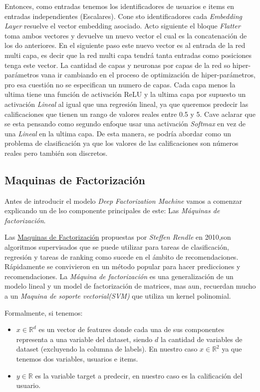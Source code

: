 \documentclass[11pt,a4paper,twoside]{thesis}
\begin{document}
Entonces, como entradas tenemos los identificadores de usuarios e items en entradas independientes (Escalares). Cone sto identificadores cada \textit{Embedding Layer} resuelve el vector embedding asociado. Acto siguiente el bloque \textit{Flatter} toma ambos vectores y devuelve un nuevo vector el cual es la concatenación de los do anteriores. En el siguiente paso este nuevo vector es al entrada de la red multi capa, es decir que la red multi capa tendrá tanta entradas como posiciones tenga este vector. La cantidad de capas y neuronas por capas de la red so hiper-parámetros vana  ir cambiando en el proceso de optimización de hiper-parámetros, pro esa cuestión no se especifican un numero de capas. Cada capa menos la ultima tiene una función de activación ReLU y la ultima capa por supuesto un activación \textit{Lineal} al igual que una regresión lineal, ya que queremos predecir las calificaciones que tienen un rango de valores reales entre 0.5 y 5. Cave aclarar que se esta pensando como segundo enfoque usar una activación \textit{Softmax} en vez de una \textit{Lineal} en la ultima capa. De esta manera, se podría abordar como un problema de clasificación ya que los valores de las calificaciones son números reales pero también son discretos.


\subsection{Maquinas de Factorización}


Antes de introducir el modelo \textit{Deep Factorization Machine} vamos a comenzar explicando un de lso componente principales de este: Las \textit{Máquinas de factorización}. 

Las \href{https://www.csie.ntu.edu.tw/~b97053/paper/Rendle2010FM.pdf}{Maquinas de Factorización} propuestas por \textit{Steffen Rendle} en 2010,son algoritmos supervisados que se puede utilizar para tareas de clasificación, regresión y tareas de ranking como sucede en el ámbito de recomendaciones. Rápidamente se convivieron en un método popular para hacer predicciones y recomendaciones. La \textit{Máquina de factorización} es una generalización de un modelo lineal y un model de factorización de matrices, mas aun, recuerdan mucho a un \textit{Maquina de soporte vectorial(SVM)} que utiliza un kernel polinomial.


Formalmente, si tenemos:

\begin{itemize}
	\item $x\in\mathbb{R}^{d}$ es un vector de features donde cada una de sus componentes representa a una variable del dataset, siendo $d$ la cantidad de variables de dataset (excluyendo la columna de labels). En nuestro caso $x\in\mathbb{R}^{2}$ ya que tenemos dos variables, usuarios e items.
	\item $y\in\mathbb{R}$ es la variable target a predecir, en nuestro caso es la calificación del usuario. 
\end{itemize}
\end{document}
